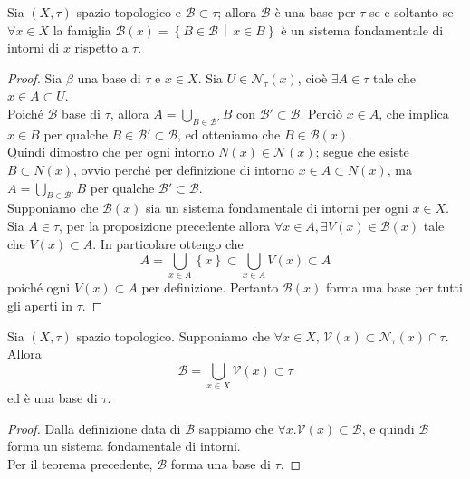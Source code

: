 \begin{theorem}
	Sia $(X,\tau)$ spazio topologico e $\mathcal{B} \subset \tau$; allora $\mathcal{B}$ è una base per $\tau$ se e soltanto se $\forall x \in X$ la famiglia $\mathcal{B}(x) = \left\{B \in \mathcal{B} \,\middle|\, x \in B \right\}$ è un sistema fondamentale di intorni di $x$ rispetto a $\tau$.
\end{theorem}
\begin{proof}
	Sia $\beta$ una base di $\tau$ e $x \in X$. Sia $U \in \mathcal{N}_\tau(x)$, cioè $\exists A \in \tau$ tale che $x \in A \subset U$. \\ Poiché $\mathcal{B}$ base di $\tau$, allora $A = \bigcup_{B \in \mathcal{B}'} B$ con $\mathcal{B}' \subset \mathcal{B}$. Perciò $x \in A$, che implica $x \in B$ per qualche $B \in \mathcal{B}' \subset \mathcal{B}$, ed otteniamo che $B \in \mathcal{B}(x)$. \\ Quindi dimostro che per ogni intorno $N(x) \in \mathcal{N}(x)$; segue che esiste $B \subset N(x)$, ovvio perché per definizione di intorno $x \in A \subset N(x)$, ma $A = \bigcup_{B \in \mathcal{B}'} B$ per qualche $\mathcal{B}' \subset \mathcal{B}$.\\  	
	Supponiamo che $\mathcal{B}(x)$ sia un sistema fondamentale di intorni per ogni $x \in X$. Sia $A \in \tau$, per la proposizione precedente allora $\forall x \in A, \exists V(x) \in \mathcal{B}(x)$ tale che $V(x) \subset A$. In particolare ottengo che
	\begin{equation*}
		A = \bigcup_{x \in A} \left\{x\right\} \subset \bigcup_{x \in A} V(x) \subset A
	\end{equation*} 
	poiché ogni $V(x) \subset A$ per definizione. Pertanto $\mathcal{B}(x)$ forma una base per tutti gli aperti in $\tau$.
\end{proof}

\begin{corollary}
	\label{crl:base_from_sfi}
	Sia $(X,\tau)$ spazio topologico. Supponiamo che $\forall x \in X$, $\mathcal{V}(x) \subset \mathcal{N}_\tau(x) \cap \tau$. Allora 
	\begin{equation*}
		\mathcal{B} = \bigcup_{x \in X} \mathcal{V}(x) \subset \tau
	\end{equation*}
	ed è una base di $\tau$.
\end{corollary}
\begin{proof}
	Dalla definizione data di $\mathcal{B}$ sappiamo che $\forall x . \mathcal{V}(x) \subset \mathcal{B}$, e quindi $\mathcal{B}$ forma un sistema fondamentale di intorni. \\ Per il teorema precedente, $\mathcal{B}$ forma una base di $\tau$.
\end{proof}

